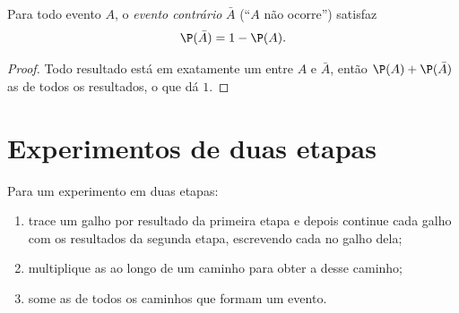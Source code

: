 \begin{proposition}[Complementar]\label{prop:g9:statproba:complement}
Para todo evento $A$, o \emph{evento contrário} $\bar A$ (``$A$ não
ocorre'') satisfaz
\[
\P(\bar A) = 1 - \P(A).
\]
\end{proposition}

\begin{proof}
Todo resultado está em exatamente um entre $A$ e $\bar A$, então
$\P(A) + \P(\bar A)$  as  de todos os resultados, o
que dá $1$.
\end{proof}

\section{Experimentos de duas etapas}

\begin{method}\label{met:g9:statproba:tree}
Para um experimento em duas etapas:
\begin{enumerate}
  \item trace um galho por resultado da primeira etapa e depois
        continue cada galho com os resultados da segunda etapa,
        escrevendo cada  no galho dela;
  \item multiplique as  ao longo de um caminho para obter
        a  desse caminho;
  \item some as  de todos os caminhos que formam um
        evento.
\end{enumerate}
\end{method}

